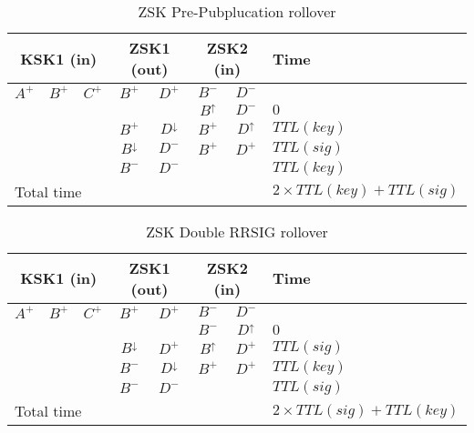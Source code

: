 \documentclass[twoside, a4paper]{article}
\begin{document}
\begin{table}[h]
\centering
\begin{tabular}{ |ccc|cc|cc|l| }
\hline
\multicolumn{3}{|c|}{KSK1 (in)} & \multicolumn{2}{c|}{ZSK1 (out)} & \multicolumn{2}{c|}{ZSK2 (in)} & Time\\
\hline
$A^{+}$ & $B^{+}$ & $C^{+}$ & $B^{+}$          & $D^{+}$          & $B^{-}$        & $D^{-}$        & \\
        &         &         &                  &                  & $B^{\uparrow}$ & $D^{-}$        & $0$\\
        &         &         & $B^{+}$          & $D^{\downarrow}$ & $B^{+}$        & $D^{\uparrow}$ & $TTL(key)$\\
        &         &         & $B^{\downarrow}$ & $D^{-}$          & $B^{+}$        & $D^{+}$        & $TTL(sig)$\\
        &         &         & $B^{-}$          & $D^{-}$          &                &                & $TTL(key)$\\
\hline
\multicolumn{7}{|l|}{Total time} & $2 \times TTL(key) + TTL(sig)$\\
\hline
\end{tabular}
\caption{ZSK Pre-Pubplucation rollover}
\label{tab:roll_prepub}
\end{table}


\begin{table}[h]
\centering
\begin{tabular}{ |ccc|cc|cc|l| }
\hline
\multicolumn{3}{|c|}{KSK1 (in)} & \multicolumn{2}{c|}{ZSK1 (out)} & \multicolumn{2}{c|}{ZSK2 (in)} & Time\\
\hline
$A^{+}$ & $B^{+}$ & $C^{+}$ & $B^{+}$          & $D^{+}$          & $B^{-}$        & $D^{-}$        & \\
        &         &         &                  &                  & $B^{-}$        & $D^{\uparrow}$ & $0$\\
        &         &         & $B^{\downarrow}$ & $D^{+}$          & $B^{\uparrow}$ & $D^{+}$        & $TTL(sig)$\\
        &         &         & $B^{-}$          & $D^{\downarrow}$ & $B^{+}$        & $D^{+}$        & $TTL(key)$\\
        &         &         & $B^{-}$          & $D^{-}$          &                &                & $TTL(sig)$\\
\hline
\multicolumn{7}{|l|}{Total time} & $2 \times TTL(sig) + TTL(key)$\\
\hline
\end{tabular}
\caption{ZSK Double RRSIG rollover}
\label{tab:roll_doublerrsig}
\end{table}
\end{document}
